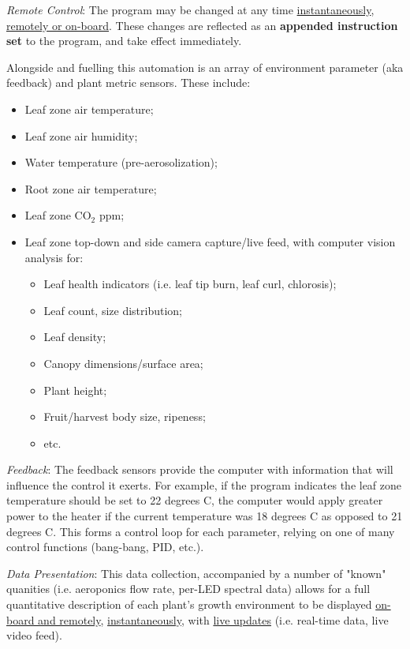 \documentclass{report}
\begin{document}
\textit{Remote Control}: The program may be changed at any time \uline{instantaneously}, \uline{remotely or on-board}. These changes are reflected as an \textbf{appended instruction set} to the program, and take effect immediately. 

Alongside and fuelling this automation is an array of environment parameter (aka feedback) and plant metric sensors. These include:
\begin{itemize}
    \item Leaf zone air temperature;
    \item Leaf zone air humidity;
    \item Water temperature (pre-aerosolization);
    \item Root zone air temperature;
    \item Leaf zone CO${}_2$ ppm;
    \item Leaf zone top-down and side camera capture/live feed, with computer vision analysis for:
    \begin{itemize}
        \item Leaf health indicators (i.e. leaf tip burn, leaf curl, chlorosis);
        \item Leaf count, size distribution;
        \item Leaf density;
        \item Canopy dimensions/surface area;
        \item Plant height;
        \item Fruit/harvest body size, ripeness;
        \item etc.
    \end{itemize}
\end{itemize}

\textit{Feedback}: The feedback sensors provide the computer with information that will influence the control it exerts. For example, if the program indicates the leaf zone temperature should be set to 22 degrees C, the computer would apply greater power to the heater if the current temperature was 18 degrees C as opposed to 21 degrees C. This forms a control loop for each parameter, relying on one of many control functions (bang-bang, PID, etc.).

\textit{Data Presentation}: This data collection, accompanied by a number of "known" quanities (i.e. aeroponics flow rate, per-LED spectral data) allows for a full quantitative description of each plant's growth environment to be displayed \uline{on-board and remotely}, \uline{instantaneously}, with \uline{live updates} (i.e. real-time data, live video feed).
\end{document}
